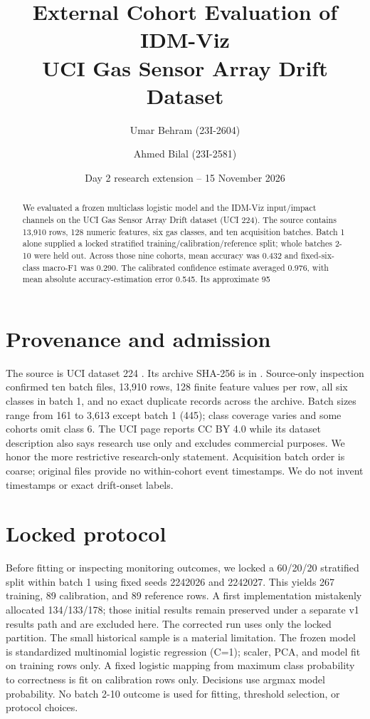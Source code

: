 \documentclass[10pt]{article}
\title{External Cohort Evaluation of IDM-Viz\\UCI Gas Sensor Array Drift Dataset}
\author{Umar Behram (23I-2604) \and Ahmed Bilal (23I-2581)}
\date{Day 2 research extension -- 15 November 2026}
\begin{document}
\maketitle
\begin{abstract}
We evaluated a frozen multiclass logistic model and the IDM-Viz input/impact channels on the UCI Gas Sensor Array Drift dataset (UCI 224). The source contains 13,910 rows, 128 numeric features, six gas classes, and ten acquisition batches. Batch 1 alone supplied a locked stratified training/calibration/reference split; whole batches 2-10 were held out. Across those nine cohorts, mean accuracy was 0.432 and fixed-six-class macro-F1 was 0.290. The calibrated confidence estimate averaged 0.976, with mean absolute accuracy-estimation error 0.545. Its approximate 95%
\end{abstract}

\section{Provenance and admission}
The source is UCI dataset 224 \cite{uci224}. Its archive SHA-256 is in . Source-only inspection confirmed ten batch files, 13,910 rows, 128 finite feature values per row, all six classes in batch 1, and no exact duplicate records across the archive. Batch sizes range from 161 to 3,613 except batch 1 (445); class coverage varies and some cohorts omit class 6. The UCI page reports CC BY 4.0 while its dataset description also says research use only and excludes commercial purposes. We honor the more restrictive research-only statement. Acquisition batch order is coarse; original files provide no within-cohort event timestamps. We do not invent timestamps or exact drift-onset labels.

\section{Locked protocol}
Before fitting or inspecting monitoring outcomes, we locked a 60/20/20 stratified split within batch 1 using fixed seeds 2242026 and 2242027. This yields 267 training, 89 calibration, and 89 reference rows. A first implementation mistakenly allocated 134/133/178; those initial results remain preserved under a separate v1 results path and are excluded here. The corrected run uses only the locked partition. The small historical sample is a material limitation. The frozen model is standardized multinomial logistic regression (C=1); scaler, PCA, and model fit on training rows only. A fixed logistic mapping from maximum class probability to correctness is fit on calibration rows only. Decisions use argmax model probability. No batch 2-10 outcome is used for fitting, threshold selection, or protocol choices.
\end{document}
